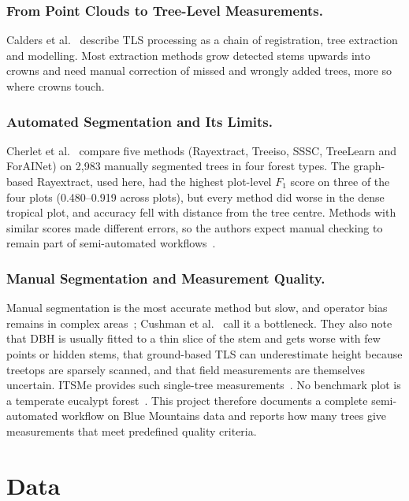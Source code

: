 \documentclass[runningheads]{llncs}
\begin{document}
\subsubsection{From Point Clouds to Tree-Level Measurements.}
Calders et al.~\cite{calders2020} describe TLS processing as a chain of registration, tree extraction and modelling. Most extraction methods grow detected stems upwards into crowns and need manual correction of missed and wrongly added trees, more so where crowns touch.

\subsubsection{Automated Segmentation and Its Limits.}
Cherlet et al.~\cite{cherlet2026} compare five methods (Rayextract, Treeiso, SSSC, TreeLearn and ForAINet) on 2,983 manually segmented trees in four forest types. The graph-based Rayextract, used here, had the highest plot-level $F_1$ score on three of the four plots (0.480--0.919 across plots), but every method did worse in the dense tropical plot, and accuracy fell with distance from the tree centre. Methods with similar scores made different errors, so the authors expect manual checking to remain part of semi-automated workflows~\cite{cherlet2026}.

\subsubsection{Manual Segmentation and Measurement Quality.}
Manual segmentation is the most accurate method but slow, and operator bias remains in complex areas~\cite{cherlet2026}; Cushman et al.~\cite{cushman2026} call it a bottleneck. They also note that DBH is usually fitted to a thin slice of the stem and gets worse with few points or hidden stems, that ground-based TLS can underestimate height because treetops are sparsely scanned, and that field measurements are themselves uncertain. ITSMe provides such single-tree measurements~\cite{terryn2023}. No benchmark plot is a temperate eucalypt forest~\cite{cherlet2026}. This project therefore documents a complete semi-automated workflow on Blue Mountains data and reports how many trees give measurements that meet predefined quality criteria.

\section{Data}\label{sec:data}
\end{document}
